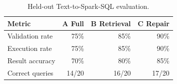 \begin{table}[htbp]
\centering
\caption{Held-out Text-to-Spark-SQL evaluation.}
\label{tab:heldout-abc}
\begin{tabular}{lrrr}
\toprule
Metric & A Full & B Retrieval & C Repair \\
\midrule
Validation rate & 75\% & 85\% & 90\% \\
Execution rate & 75\% & 85\% & 90\% \\
Result accuracy & 70\% & 80\% & 85\% \\
Correct queries & 14/20 & 16/20 & 17/20 \\
\bottomrule
\end{tabular}
\end{table}
